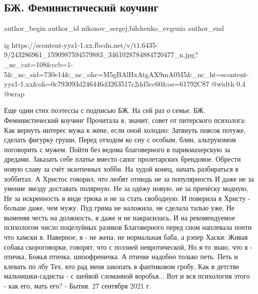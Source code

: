 
 
 
 
 
 
\subsection{БЖ. Феминистический коучинг}
\label{sec:27_09_2021.fb.nikonov_sergej.2.bilchenko_feminizm_kouching}
 
\ifcmt
 author_begin
   author_id nikonov_sergej,bilchenko_evgenia
 author_end
\fi

\ifcmt
  ig https://scontent-yyz1-1.xx.fbcdn.net/v/t1.6435-9/243286961_1590987594579883_3461028784884720477_n.jpg?_nc_cat=108&ccb=1-5&_nc_sid=730e14&_nc_ohc=M5gBAlHxAtgAX9mA0M5&_nc_ht=scontent-yyz1-1.xx&oh=0c793093d246446d3263517c2dd5cc60&oe=61792C87
  @width 0.4
  @wrap 
\fi

Еще один стих поэтессы с подписью БЖ. На сей раз о семье. 
БЖ. Феминистический коучинг
Прочитала я, значит, совет от питерского психолога:
Как вернуть интерес мужа к жене, если оной холодно:
Затянуть поясок потуже, сделать фигурку груши,
Перед отходом ко сну с особым, блин, альтруизмом поговорить с мужем.
Пойти без ведома благоверного в парикмахерскую за дредами.
Заказать себе платье вместо сапог пролетарских брендовое.
Обрести новую славу за счёт экзотичных хобби.
На худой конец, начать разбираться в хоббитах.
А Христос говорил, что любят отнюдь не за популярность
И даже не за умение звезду доставать полярную.
Не за одёжу новую, не за причёску модную,
Не за искренность в виде трюка и не за стать свободную.
И поверила я Христу - больше даже, чем мужу.
Пуд грима не наложила, не сделала талью уже,
Не выменяв честь на должность, я даже и не накрасилась,
И на рекомендуемое психологом число поцелуйных разиков
Благоверного перед сном наплевала почти что хамски я.
Наверное, я - не жена, не нормальная баба, а рэпер Хаски:
Живая собака скороговорки, говорят, что с поэзией невротической,
Но я-то знаю, что я - птичка, Божья птичка, шизофреничка.
А птичке надобно только петь. Петь и клевать по лбу
Тех, кто рад меня закопать в фантиковом гробу,
Как в детстве мальчишки-садисты - с шейкой сломанной воробья...
Вот и вся психология этого - как его, мать его? - Бытия.
27 сентября 2021 г.
